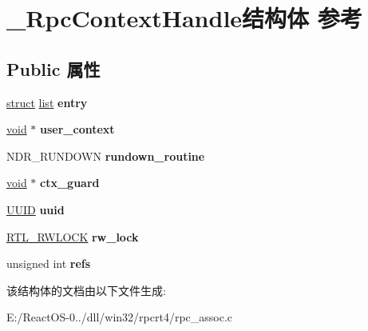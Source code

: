 \hypertarget{struct___rpc_context_handle}{}\section{\+\_\+\+Rpc\+Context\+Handle结构体 参考}
\label{struct___rpc_context_handle}
\subsection*{Public 属性}
\begin{DoxyCompactItemize}
\item 
\mbox{\label{struct___rpc_context_handle_a3deeadbee44e2db5588f38b7a01605b1}} 
\hyperlink{interfacestruct}{struct} \hyperlink{classlist}{list} {\bfseries entry}
\item 
\mbox{\label{struct___rpc_context_handle_aa399806a8a2e135dbce94256a2727801}} 
\hyperlink{interfacevoid}{void} $\ast$ {\bfseries user\+\_\+context}
\item 
\mbox{\label{struct___rpc_context_handle_a9e7f70607e88a20141484baf7c57c8f7}} 
N\+D\+R\+\_\+\+R\+U\+N\+D\+O\+WN {\bfseries rundown\+\_\+routine}
\item 
\mbox{\label{struct___rpc_context_handle_a498e0ab58cdab05b51e3e48f0e9bda92}} 
\hyperlink{interfacevoid}{void} $\ast$ {\bfseries ctx\+\_\+guard}
\item 
\mbox{\label{struct___rpc_context_handle_ad718f1405754dab23c2e607b1a1868d6}} 
\hyperlink{interface_g_u_i_d}{U\+U\+ID} {\bfseries uuid}
\item 
\mbox{\label{struct___rpc_context_handle_a7ff996387272ef1c4f821ebecab8529a}} 
\hyperlink{struct___r_t_l___r_w_l_o_c_k}{R\+T\+L\+\_\+\+R\+W\+L\+O\+CK} {\bfseries rw\+\_\+lock}
\item 
\mbox{\label{struct___rpc_context_handle_aa1f163b7fec97f8905cee612c913c206}} 
unsigned int {\bfseries refs}
\end{DoxyCompactItemize}


该结构体的文档由以下文件生成\+:\begin{DoxyCompactItemize}
\item 
E\+:/\+React\+O\+S-\/0../dll/win32/rpcrt4/rpc\+\_\+assoc.\+c\end{DoxyCompactItemize}
